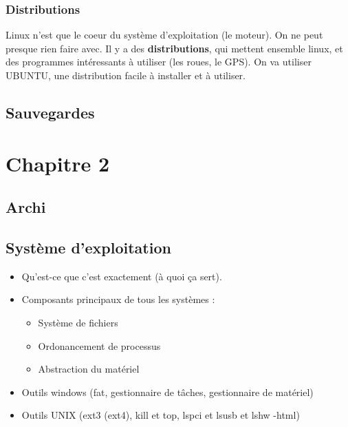 \documentclass{book}
\def\keyword{\textbf}
\begin{document}
\subsection{Distributions}
Linux n'est que le coeur du système d'exploitation (le moteur). On ne peut presque rien faire avec. Il y a des \keyword{distributions}, qui mettent ensemble linux, et des programmes intéressants à utiliser (les roues, le GPS). On va utiliser UBUNTU, une distribution facile à installer et à utiliser.

\section{Sauvegardes}

\chapter{Chapitre 2}

\section{Archi}

\section{Système d'exploitation}
\label{sec:Système d'exploitation}

\begin{itemize}
\item Qu'est-ce que c'est exactement (à quoi ça sert).
\item Composants principaux de tous les systèmes :
  \begin{itemize}
  \item Système de fichiers
  \item Ordonancement de processus
  \item Abstraction du matériel
  \end{itemize}
\item Outils windows (fat, gestionnaire de tâches, gestionnaire de matériel)
\item Outils UNIX (ext3 (ext4), kill et top, lspci et lsusb et lshw -html)
\end{itemize}
\end{document}
